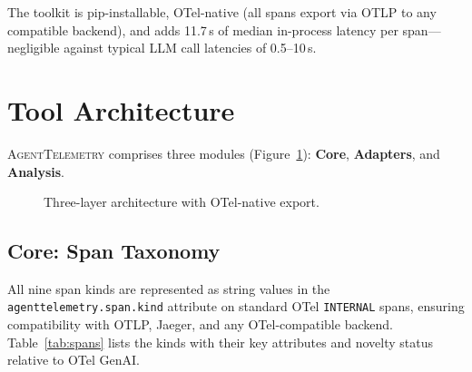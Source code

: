 \documentclass[sigconf,review]{acmart}
\begin{document}
\noindent
The toolkit is pip-installable, OTel-native (all spans export via OTLP
to any compatible backend), and adds 11.7\,\textmu s of median
in-process latency per span---negligible against typical LLM call
latencies of 0.5--10\,s.

\section{Tool Architecture}
\label{sec:architecture}

\textsc{AgentTelemetry} comprises three modules
(Figure~\ref{fig:arch}): \textbf{Core},
\textbf{Adapters}, and \textbf{Analysis}.

\begin{figure}[t]
\centering
\small
\setlength{\fboxsep}{3pt}
\caption{Three-layer architecture with OTel-native export.}
\label{fig:arch}
\end{figure}

\subsection{Core: Span Taxonomy}

All nine span kinds are represented as string values in
the \texttt{agenttelemetry.\allowbreak{}span.\allowbreak{}kind}
attribute on standard OTel \texttt{INTERNAL} spans,
ensuring compatibility with OTLP, Jaeger, and any
OTel-compatible backend.
Table~\ref{tab:spans} lists the kinds with their key attributes
and novelty status relative to OTel GenAI.
\end{document}
